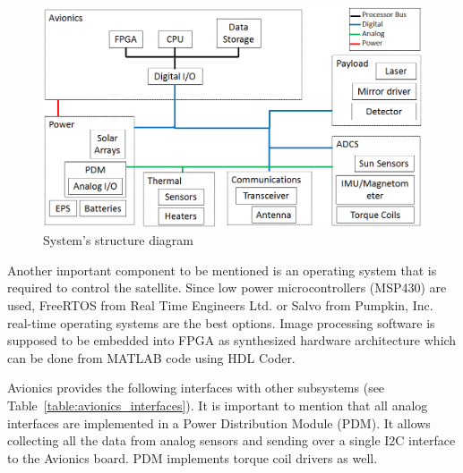 \documentclass[12pt]{article}
\begin{document}
\begin{figure}[ht]
\centering
  \includegraphics[width=7in]{images/Avionics_fig2.PNG}
\caption{System's structure diagram}
\label{fig:avionics_architecture}
\end{figure}

Another important component to be mentioned is an operating system that is required to control the satellite. Since low power microcontrollers (MSP430) are used, FreeRTOS from Real Time Engineers Ltd. \cite{avionics_RTOS} or Salvo from Pumpkin, Inc. \cite{avionics_pumpkin} real-time operating systems are the best options. Image processing software is supposed to be embedded into FPGA as synthesized hardware architecture which can be done from MATLAB code using HDL Coder.

Avionics provides the following interfaces with other subsystems (see Table~\ref{table:avionics_interfaces}). It is important to mention that all analog interfaces are implemented in a Power Distribution Module (PDM). It allows collecting all the data from analog sensors and sending over a single I2C interface to the Avionics board. PDM implements torque coil drivers as well.
\end{document}
